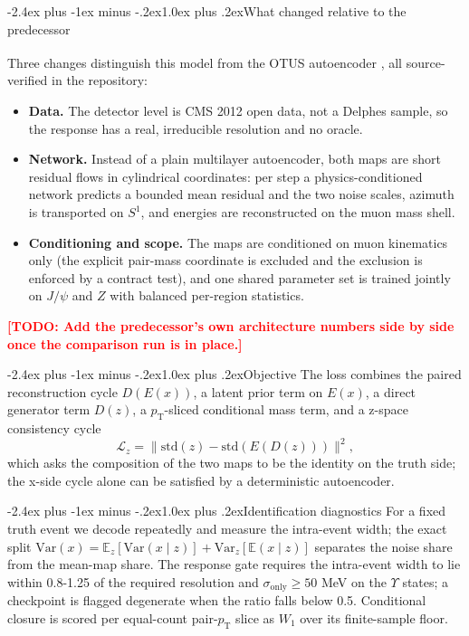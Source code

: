 \documentclass[11pt,a4paper]{article}
\makeatletter
\renewcommand\subsection{\@startsection{subsection}{2}{\z@}%
  {-2.4ex plus -1ex minus -.2ex}{1.0ex plus .2ex}{\normalfont\normalsize\bfseries}}
\newcommand{\pt}{\ensuremath{p_{\mathrm{T}}}}
\newcommand{\todo}[1]{\textcolor{red}{\textbf{[TODO: #1]}}}
\makeatother
\begin{document}
\subsection{What changed relative to the predecessor}

Three changes distinguish this model from the OTUS autoencoder
\textsuperscript{\cite{otus_paper}}, all source-verified in the repository:

\begin{itemize}
  \item \textbf{Data.} The detector level is CMS 2012 open data, not a Delphes
        sample, so the response has a real, irreducible resolution and no oracle.
  \item \textbf{Network.} Instead of a plain multilayer autoencoder, both maps are
        short residual flows in cylindrical coordinates: per step a
        physics-conditioned network predicts a bounded mean residual and the two
        noise scales, azimuth is transported on $S^1$, and energies are
        reconstructed on the muon mass shell.
  \item \textbf{Conditioning and scope.} The maps are conditioned on muon
        kinematics only (the explicit pair-mass coordinate is excluded and the
        exclusion is enforced by a contract test), and one shared parameter set is
        trained jointly on $J/\psi$ and $Z$ with balanced per-region statistics.
\end{itemize}

\todo{Add the predecessor's own architecture numbers side by side once the
comparison run is in place.}

\subsection{Objective}
The loss combines the paired reconstruction cycle $D(E(x))$, a latent prior term on
$E(x)$, a direct generator term $D(z)$, a $\pt$-sliced conditional mass term, and a
z-space consistency cycle
\begin{equation}
\mathcal{L}_{z} = \big\| \mathrm{std}(z) - \mathrm{std}(E(D(z))) \big\|^2 ,
\end{equation}
which asks the composition of the two maps to be the identity on the truth side; the
x-side cycle alone can be satisfied by a deterministic autoencoder.

\subsection{Identification diagnostics}
For a fixed truth event we decode repeatedly and measure the intra-event width; the
exact split $\mathrm{Var}(x) = \mathbb{E}_z[\mathrm{Var}(x\mid z)] +
\mathrm{Var}_z[\mathbb{E}(x\mid z)]$ separates the noise share from the mean-map
share. The response gate requires the intra-event width to lie within 0.8-1.25 of the
required resolution and $\sigma_{\mathrm{only}} \geq 50$ MeV on the $\Upsilon$ states;
a checkpoint is flagged degenerate when the ratio falls below 0.5. Conditional closure
is scored per equal-count pair-$\pt$ slice as $W_1$ over its finite-sample floor.
\end{document}
